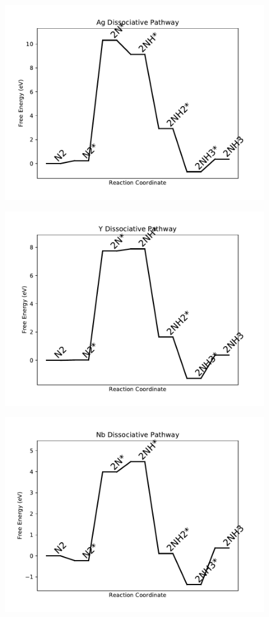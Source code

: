 \begin{figure}
\centering
\includegraphics[width=0.8\linewidth]{data/plots/Ag_dissociative.pdf}
\end{figure}

\begin{figure}
\centering
\includegraphics[width=0.8\linewidth]{data/plots/Y_dissociative.pdf}
\end{figure}

\begin{figure}
\centering
\includegraphics[width=0.8\linewidth]{data/plots/Nb_dissociative.pdf}
\end{figure}

